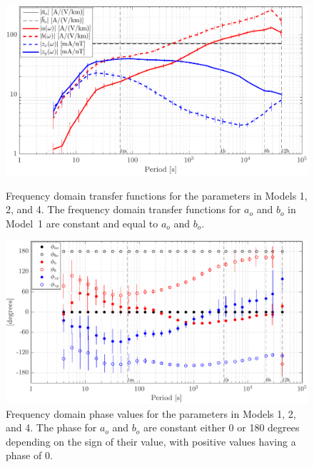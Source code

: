 \documentclass[draft,linenumbers]{agujournal2018}
\begin{document}
\begin{figure}[h]
\centering
\includegraphics[width=\textwidth]{figures/plot_model_summary_Z-options-1.pdf}
\caption{Frequency domain transfer functions for the parameters in Models 1, 2, and 4. The frequency domain transfer functions for $a_o$ and $b_o$ in Model~1 are constant and equal to $a_o$ and $b_o$.}
\label{Z}

\vspace{4em}

\centering
\includegraphics[width=\textwidth]{figures/plot_model_summary_Phi-options-1.pdf}
\caption{Frequency domain phase values for the parameters in Models 1, 2, and 4. The phase for $a_o$ and $b_o$ are constant either 0 or 180 degrees depending on the sign of their value, with positive values having a phase of 0.}
\label{Phi}
\end{figure}
\end{document}
